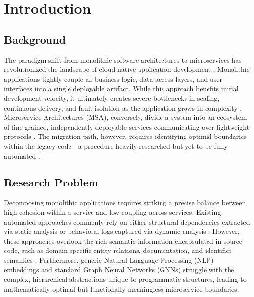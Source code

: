 \documentclass[12pt, a4paper]{article}
\begin{document}
\newpage
\tableofcontents
\newpage

\section{Introduction}

\subsection{Background}
The paradigm shift from monolithic software architectures to microservices has revolutionized the landscape of cloud-native application development \cite{velepucha2021, wolfart2021}. Monolithic applications tightly couple all business logic, data access layers, and user interfaces into a single deployable artifact. While this approach benefits initial development velocity, it ultimately creates severe bottlenecks in scaling, continuous delivery, and fault isolation as the application grows in complexity \cite{auer2021, romani2022}. Microservice Architectures (MSA), conversely, divide a system into an ecosystem of fine-grained, independently deployable services communicating over lightweight protocols \cite{bolanowski2022}. The migration path, however, requires identifying optimal boundaries within the legacy code—a procedure heavily researched but yet to be fully automated \cite{abgaz2023, zhang2020}.

\subsection{Research Problem}
Decomposing monolithic applications requires striking a precise balance between high cohesion within a service and low coupling across services. Existing automated approaches commonly rely on either structural dependencies extracted via static analysis \cite{krause2020, sooksatra2024} or behavioral logs captured via dynamic analysis \cite{jin2021, liu2022}. However, these approaches overlook the rich semantic information encapsulated in source code, such as domain-specific entity relations, documentation, and identifier semantics \cite{brito2021, aitmansour2025semantic}. Furthermore, generic Natural Language Processing (NLP) embeddings and standard Graph Neural Networks (GNNs) \cite{nguyen2022, trabelsi2024} struggle with the complex, hierarchical abstractions unique to programmatic structures, leading to mathematically optimal but functionally meaningless microservice boundaries.
\end{document}
